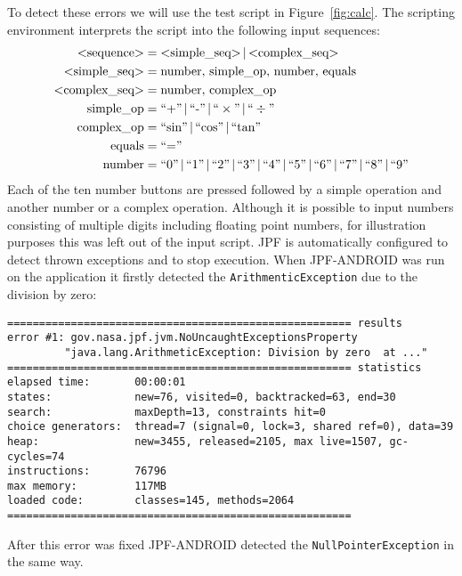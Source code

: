 \documentclass{acm_proc_article-sp}
\begin{document}
To detect these errors we will use the test script in Figure~\ref{fig:calc}. The scripting environment interprets the script into the
following input sequences:
\begin{align*}
\text{<sequence>} &= \text{<simple\_seq>}\,|\,\text{<complex\_seq>}\\
\text{<simple\_seq>} &= \text{number},\,\text{simple\_op},\,\text{number},\,\text{equals}\\
\text{<complex\_seq>} &= \text{number},\,\text{complex\_op}\\
\text{simple\_op} &= \text{``+''}\,|\,\text{``-''}\,|\,\text{``}\times\text{''}\,|\,\text{``}\div\text{''}\\
\text{complex\_op} &= \text{``sin''}\,|\,\text{``cos''}\,|\,\text{``tan''}\\
\text{equals} &= \text{``=''} \\
\text{number} &= \text{``0''\,|\,``1''\,|\,``2''\,|\,``3''\,|\,``4''\,|\,``5''\,|\,``6''\,|\,``7''\,|\,``8''\,|\,``9''}
\end{align*}
Each of the ten number buttons are pressed followed by a simple operation and another number or a complex operation. Although it is possible
to input numbers consisting of multiple digits including floating point numbers, for illustration purposes this was left out of the input script.
JPF is automatically configured to detect thrown exceptions and to stop execution. When JPF-ANDROID was run on the application it firstly
detected the \texttt{ArithmenticException} due to the division by zero:

\vspace*{-10pt}
\begingroup
 \fontsize{6pt}{7pt}\selectfont
\begin{verbatim}
====================================================== results
error #1: gov.nasa.jpf.jvm.NoUncaughtExceptionsProperty 
         "java.lang.ArithmeticException: Division by zero  at ..."
====================================================== statistics
elapsed time:       00:00:01
states:             new=76, visited=0, backtracked=63, end=30
search:             maxDepth=13, constraints hit=0
choice generators:  thread=7 (signal=0, lock=3, shared ref=0), data=39
heap:               new=3455, released=2105, max live=1507, gc-cycles=74
instructions:       76796
max memory:         117MB
loaded code:        classes=145, methods=2064
======================================================
\end{verbatim}
\endgroup
\vspace*{-10pt}
After this error was fixed JPF-ANDROID detected the \texttt{NullPointerException} in the same way.
\end{document}
